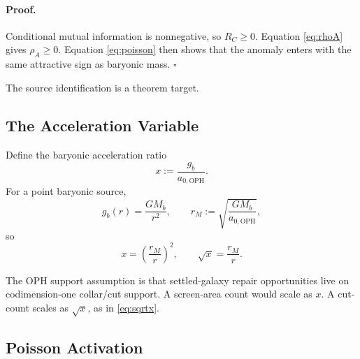\documentclass[11pt]{article}
\newcommand{\aoph}{a_{0,\mathrm{OPH}}}
\begin{document}
\paragraph{Proof.}
Conditional mutual information is nonnegative, so \(R_C\ge0\).  Equation
\eqref{eq:rhoA} gives \(\rho_A\ge0\).  Equation \eqref{eq:poisson} then shows
that the anomaly enters with the same attractive sign as baryonic mass.
\(\square\)

The source identification is a theorem target.

\subsection{The Acceleration Variable}

Define the baryonic acceleration ratio
\begin{equation}
  x := \frac{g_b}{\aoph}.
\end{equation}
For a point baryonic source,
\begin{equation}
  g_b(r)=\frac{G M_b}{r^2},
  \qquad
  r_M := \sqrt{\frac{G M_b}{\aoph}},
\end{equation}
so
\begin{equation}
  x=\left(\frac{r_M}{r}\right)^2,
  \qquad
  \sqrt{x}=\frac{r_M}{r}.
  \label{eq:sqrtx}
\end{equation}

The OPH support assumption is that settled-galaxy repair opportunities live
on codimension-one collar/cut support.  A screen-area count would scale as
\(x\).  A cut-count scales as \(\sqrt{x}\), as in \eqref{eq:sqrtx}.

\subsection{Poisson Activation}
\end{document}
